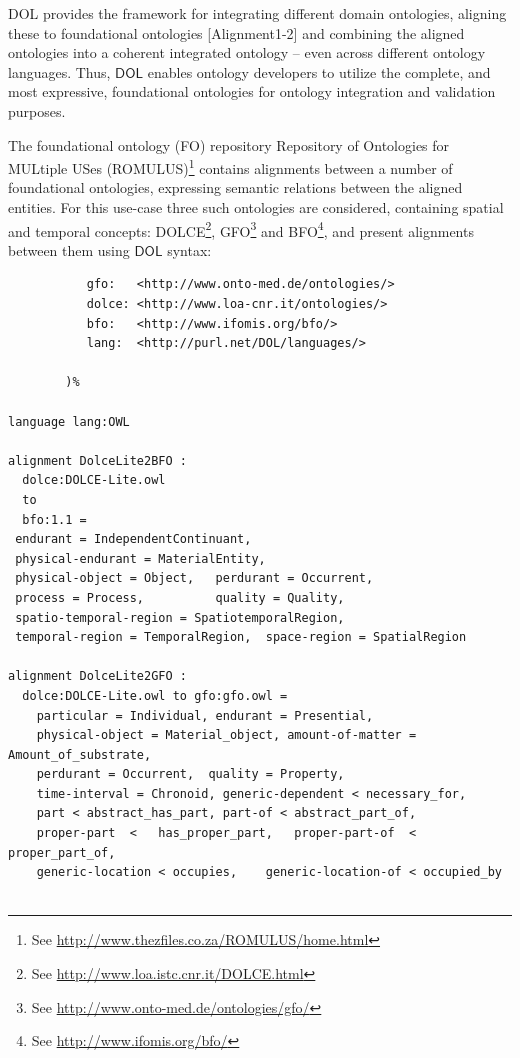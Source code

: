 \documentclass[10pt,fleqn,final]{scrreprt}
\newcommand*{\DOL}{\ensuremath{\mathsf{DOL}}\xspace}
\newenvironment{definitions}[0]{\medskip }{}
\begin{document}
\begin{definitions}
DOL  provides the framework for integrating different domain ontologies, aligning these to 
foundational ontologies [Alignment1-2] and combining the aligned ontologies into a coherent 
integrated ontology -- even across different ontology languages. Thus, \DOL  enables ontology 
developers to utilize the complete, and most expressive, foundational ontologies for ontology 
integration and validation purposes. 

The foundational ontology (FO) repository Repository of Ontologies for MULtiple USes (ROMULUS)\footnote{See \url{http://www.thezfiles.co.za/ROMULUS/home.html}}
contains alignments between a number of foundational ontologies, expressing semantic relations between the aligned
entities.  For this use-case three such ontologies are considered, containing spatial and temporal concepts: DOLCE\footnote{See \url{http://www.loa.istc.cnr.it/DOLCE.html}}, GFO\footnote{See \url{http://www.onto-med.de/ontologies/gfo/}} and BFO\footnote{See \url{http://www.ifomis.org/bfo/}}, and present alignments between them 
using \DOL syntax:

\begin{lstlisting}[basicstyle=\ttfamily\footnotesize,language=dolText,morekeywords={props,ObjectProperty,Class,DisjointUnionOf,SubClassOf,Characteristics,Transitive,Asymmetric,SubPropertyOf,DisjointClasses,EquivalentTo,inverse,only,forall,iff,if,or,exists,distributed,from},escapechar=@,mathescape]
%prefix(
           gfo:   <http://www.onto-med.de/ontologies/>
           dolce: <http://www.loa-cnr.it/ontologies/>
           bfo:   <http://www.ifomis.org/bfo/>
           lang:  <http://purl.net/DOL/languages/>

        )%

language lang:OWL

alignment DolceLite2BFO :
  dolce:DOLCE-Lite.owl
  to
  bfo:1.1 =
 endurant = IndependentContinuant,
 physical-endurant = MaterialEntity,
 physical-object = Object,   perdurant = Occurrent,
 process = Process,          quality = Quality,
 spatio-temporal-region = SpatiotemporalRegion,
 temporal-region = TemporalRegion,  space-region = SpatialRegion

alignment DolceLite2GFO :
  dolce:DOLCE-Lite.owl to gfo:gfo.owl =
 	particular = Individual, endurant = Presential,
 	physical-object = Material_object, amount-of-matter = Amount_of_substrate,
 	perdurant = Occurrent, 	quality = Property,
 	time-interval = Chronoid, generic-dependent < necessary_for,
 	part < abstract_has_part, part-of < abstract_part_of,
 	proper-part  <	 has_proper_part,  	proper-part-of  < proper_part_of,
 	generic-location < occupies, 	generic-location-of < occupied_by


\end{lstlisting}
\end{definitions}
\end{document}
